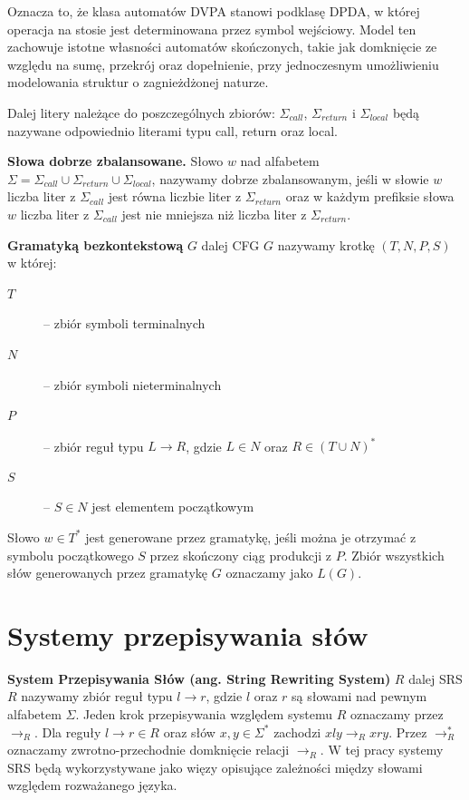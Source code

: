 Oznacza to, że klasa automatów DVPA stanowi podklasę DPDA, w której operacja na stosie jest determinowana przez symbol wejściowy.
Model ten zachowuje istotne własności automatów skończonych, takie jak domknięcie ze względu na sumę, przekrój oraz dopełnienie,
przy jednoczesnym umożliwieniu modelowania struktur o zagnieżdżonej naturze.

Dalej litery należące do poszczególnych zbiorów: $\Sigma_{call}$, $\Sigma_{return}$ i $\Sigma_{local}$ będą nazywane odpowiednio
literami typu call, return oraz local.

\textbf{Słowa dobrze zbalansowane.} Słowo $w$ nad alfabetem $\Sigma = \Sigma_{call} \cup \Sigma_{return} \cup \Sigma_{local}$, nazywamy dobrze
zbalansowanym, jeśli w słowie $w$ liczba liter z $\Sigma_{call}$ jest równa liczbie liter z $\Sigma_{return}$ oraz w każdym prefiksie słowa $w$
liczba liter z $\Sigma_{call}$ jest nie mniejsza niż liczba liter z $\Sigma_{return}$.


\textbf{Gramatyką bezkontekstową} $G$ dalej CFG $G$ nazywamy krotkę $(T, N, P, S)$ w której:
\begin{description}
    \item[$T$] -- zbiór symboli terminalnych
    \item[$N$] -- zbiór symboli nieterminalnych
    \item[$P$] -- zbiór reguł typu $L \rightarrow R$, gdzie $L \in N$ oraz $R \in (T \cup N)^*$
    \item[$S$] -- $S \in N$ jest elementem początkowym
\end{description}
Słowo $w \in T^*$ jest generowane przez gramatykę, jeśli można je otrzymać z symbolu początkowego $S$ przez skończony
ciąg produkcji z $P$. Zbiór wszystkich słów generowanych przez gramatykę $G$ oznaczamy jako $L(G)$.

\section{Systemy przepisywania słów}

\textbf{System Przepisywania Słów (ang. String Rewriting System)} $R$ dalej SRS $R$ nazywamy zbiór reguł typu $l \to r$,
gdzie $l$ oraz $r$ są słowami nad pewnym alfabetem $\Sigma$. Jeden krok przepisywania względem systemu $R$ oznaczamy przez $\to_R$.
Dla reguły $l \to r \in R$ oraz słów $x,y \in \Sigma^*$ zachodzi $xly \to_R xry$.
Przez $\to_R^*$ oznaczamy zwrotno-przechodnie domknięcie relacji $\to_R$.
W tej pracy systemy SRS będą wykorzystywane jako więzy opisujące zależności między słowami względem rozważanego języka.

